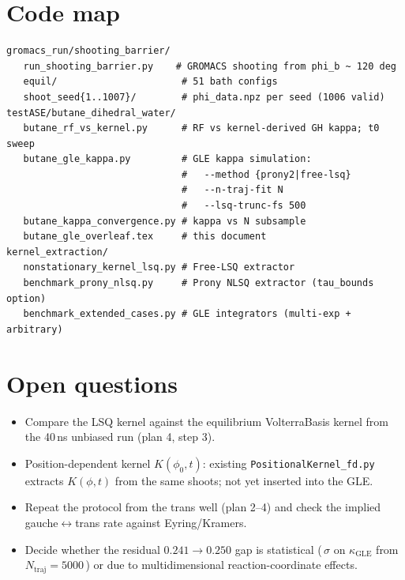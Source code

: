 \documentclass[11pt]{article}
\newcommand{\GLE}{\mathrm{GLE}}
\begin{document}
\section{Code map}

\begin{lstlisting}[basicstyle=\ttfamily\footnotesize, breaklines=true]
gromacs_run/shooting_barrier/
   run_shooting_barrier.py    # GROMACS shooting from phi_b ~ 120 deg
   equil/                      # 51 bath configs
   shoot_seed{1..1007}/        # phi_data.npz per seed (1006 valid)
testASE/butane_dihedral_water/
   butane_rf_vs_kernel.py      # RF vs kernel-derived GH kappa; t0 sweep
   butane_gle_kappa.py         # GLE kappa simulation:
                               #   --method {prony2|free-lsq}
                               #   --n-traj-fit N
                               #   --lsq-trunc-fs 500
   butane_kappa_convergence.py # kappa vs N subsample
   butane_gle_overleaf.tex     # this document
kernel_extraction/
   nonstationary_kernel_lsq.py # Free-LSQ extractor
   benchmark_prony_nlsq.py     # Prony NLSQ extractor (tau_bounds option)
   benchmark_extended_cases.py # GLE integrators (multi-exp + arbitrary)
\end{lstlisting}

\section{Open questions}
\begin{itemize}
\item Compare the LSQ kernel against the equilibrium VolterraBasis kernel
from the 40\,ns unbiased run (plan 4, step 3).
\item Position-dependent kernel $K(\phi_0, t)$: existing
\texttt{PositionalKernel\_fd.py} extracts $K(\phi, t)$ from the same
shoots; not yet inserted into the GLE.
\item Repeat the protocol from the trans well (plan 2--4) and check the
implied gauche$\leftrightarrow$trans rate against Eyring/Kramers.
\item Decide whether the residual $0.241 \to 0.250$ gap is statistical
(\,$\sigma$ on $\kappa_\GLE$ from $N_\mathrm{traj} = 5000$\,) or due to
multidimensional reaction-coordinate effects.
\end{itemize}
\end{document}
